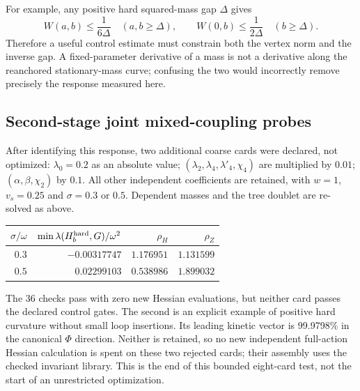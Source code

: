 \documentclass[11pt]{article}
\begin{document}
For example, any positive hard squared-mass gap $\Delta$ gives
\begin{equation}
 W(a,b)\le\frac{1}{6\Delta}\quad(a,b\ge\Delta),\qquad
 W(0,b)\le\frac{1}{2\Delta}\quad(b\ge\Delta).
\end{equation}
Therefore a useful control estimate must constrain both the vertex
norm and the inverse gap. A fixed-parameter derivative of a mass is
not a derivative along the reanchored stationary-mass curve; confusing
the two would incorrectly remove precisely the response measured here.

\subsection{Second-stage joint mixed-coupling probes}
After identifying this response, two additional coarse cards were
declared, not optimized: $\lambda_0=0.2$ as an absolute value;
$(\lambda_2,\lambda_4,\lambda'_4,\chi_4)$ are multiplied by $0.01$;
$(\alpha,\beta,\chi_2)$ by $0.1$. All other independent coefficients
are retained, with $w=1$, $v_s=0.25$ and $\sigma=0.3$ or $0.5$.
Dependent masses and the tree doublet are re-solved as above.
\begin{center}
\begin{tabular}{rrrr}
\toprule $\sigma/\omega$ & $\min\lambda(H_b^{\rm hard},G)/\omega^2$
& $\rho_H$ & $\rho_Z$\\\midrule
$0.3$ & $-0.00317747$ & $1.176951$ & $1.131599$\\
$0.5$ & $0.02299103$ & $0.538986$ & $1.899032$\\\bottomrule
\end{tabular}
\end{center}
The 36 checks pass with zero new Hessian evaluations, but neither card
passes the declared control gates. The second is an explicit example
of positive hard curvature without small loop insertions. Its leading
kinetic vector is 99.9798\% in the canonical $\Phi$ direction. Neither
is retained, so no new independent full-action Hessian calculation is
spent on these two rejected cards; their assembly uses the checked
invariant library. This is the end of this bounded eight-card test,
not the start of an unrestricted optimization.
\end{document}
